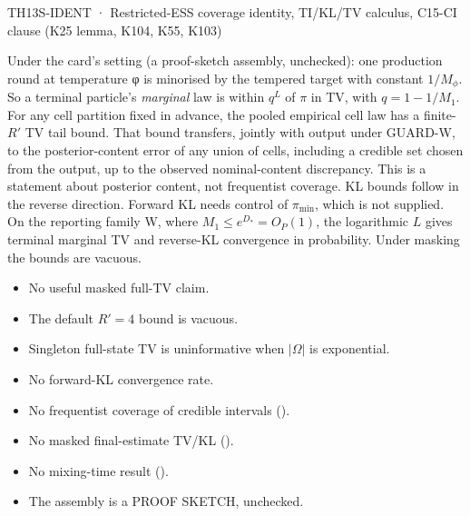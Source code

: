 \begin{card}{TH13}{S-IDENT · Restricted-ESS coverage identity, TI/KL/TV calculus, C15-CI clause (K25 lemma, K104, K55, K103)}
\begin{plain}
Under the card's setting (a proof-sketch assembly, unchecked): one production round at temperature φ is minorised by the tempered target with constant $1/M_\phi$. So a terminal particle's \emph{marginal} law is within $q^L$ of $\pi$ in TV, with $q=1-1/M_1$. For any cell partition fixed in advance, the pooled empirical cell law has a finite-$R'$ TV tail bound. That bound transfers, jointly with output under GUARD-W, to the posterior-content error of any union of cells, including a credible set chosen from the output, up to the observed nominal-content discrepancy. This is a statement about posterior content, not frequentist coverage. KL bounds follow in the reverse direction. Forward KL needs control of $\pi_{\min}$, which is not supplied. On the reporting family W, where $M_1\le e^{D_{*}}=O_P(1)$, the logarithmic $L$ gives terminal marginal TV and reverse-KL convergence in probability. Under masking the bounds are vacuous.
\end{plain}
\begin{notproved}
\begin{itemize}
\item No useful masked full-TV claim.
\item The default $R'=4$ bound is vacuous.
\item Singleton full-state TV is uninformative when $|\Omega|$ is exponential.
\item No forward-KL convergence rate.
\item No frequentist coverage of credible intervals ().
\item No masked final-estimate TV/KL ().
\item No mixing-time result ().
\item The assembly is a PROOF SKETCH, unchecked.
\end{itemize}
 
\end{notproved}
\end{card}

